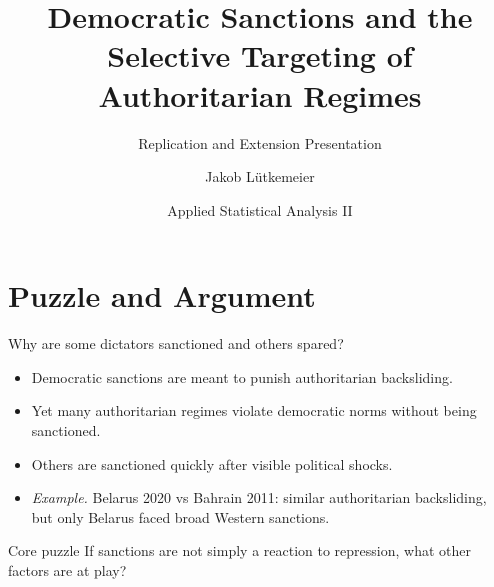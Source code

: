 \documentclass[
11pt,notheorems,hyperref={pdfauthor=Jakob}
]{beamer}
\title[Replication Project]{Democratic Sanctions and the Selective Targeting of Authoritarian Regimes}
\subtitle{Replication and Extension Presentation}
\author[Jakob]{Jakob Lütkemeier}
\institute{M.Sc. Applied Social Data Science \\ Trinity College Dublin}
\date{Applied Statistical Analysis II}
\begin{document}
	
	{
		\begin{frame}
			\titlepage
		\end{frame}
	}
	\addtocounter{framenumber}{-1}
	
	\section{Puzzle and Argument}
	
	\begin{frame}{Why are some dictators sanctioned and others spared?}
		\begin{itemize}
			\item Democratic sanctions are meant to punish authoritarian backsliding.
			\item Yet many authoritarian regimes violate democratic norms without being sanctioned.
			\item Others are sanctioned quickly after visible political shocks.
			\item \textit{Example.} Belarus 2020 vs Bahrain 2011: similar authoritarian backsliding, but only Belarus faced broad Western sanctions.
		\end{itemize}
		
		\vspace{0.5em}
		
		\begin{alertblock}{Core puzzle}
			If sanctions are not simply a reaction to repression, what other factors are at play?
		\end{alertblock}
	\end{frame}
	
\end{document}
